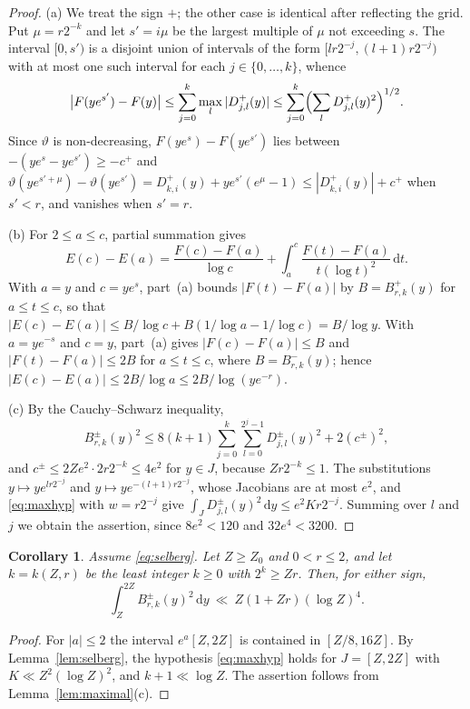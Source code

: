 \documentclass[11pt,reqno]{amsart}
\newtheorem{corollary}[theorem]{Corollary}
\theoremstyle{definition}
\theoremstyle{remark}
\numberwithin{equation}{section}
\newcommand{\dd}{\mathrm{d}}
\begin{document}
\begin{proof}
(a) We treat the sign $+$; the other case is identical after reflecting the grid. Put $\mu=r2^{-k}$ and let $s'=i\mu$ be the largest multiple of $\mu$ not exceeding $s$. The interval $[0,s')$ is a disjoint union of intervals of the form $[lr2^{-j},(l+1)r2^{-j})$ with at most one such interval for each $j\in\{0,\dots,k\}$, whence
\[
 \bigl|F(ye^{s'})-F(y)\bigr|\le\sum_{j=0}^k\max_{l}|D^+_{j,l}(y)|\le\sum_{j=0}^k\Bigl(\sum_{l}D^+_{j,l}(y)^2\Bigr)^{1/2} .
\]
Since $\vartheta$ is non-decreasing, $F(ye^s)-F(ye^{s'})$ lies between $-(ye^s-ye^{s'})\ge-c^+$ and $\vartheta(ye^{s'+\mu})-\vartheta(ye^{s'})=D^+_{k,i}(y)+ye^{s'}(e^{\mu}-1)\le|D^+_{k,i}(y)|+c^+$ when $s'<r$, and vanishes when $s'=r$.

(b) For $2\le a\le c$, partial summation gives
\[
 E(c)-E(a)=\frac{F(c)-F(a)}{\log c}+\int_a^c\frac{F(t)-F(a)}{t(\log t)^2}\,\dd t .
\]
With $a=y$ and $c=ye^s$, part~(a) bounds $|F(t)-F(a)|$ by $B=B^+_{r,k}(y)$ for $a\le t\le c$, so that $|E(c)-E(a)|\le B/\log c+B(1/\log a-1/\log c)=B/\log y$. With $a=ye^{-s}$ and $c=y$, part~(a) gives $|F(c)-F(a)|\le B$ and $|F(t)-F(a)|\le2B$ for $a\le t\le c$, where $B=B^-_{r,k}(y)$; hence $|E(c)-E(a)|\le2B/\log a\le2B/\log(ye^{-r})$.

(c) By the Cauchy--Schwarz inequality,
\[
 B^\pm_{r,k}(y)^2\le8(k+1)\sum_{j=0}^k\sum_{l=0}^{2^j-1}D^\pm_{j,l}(y)^2+2(c^\pm)^2 ,
\]
and $c^\pm\le2Ze^2\cdot2r2^{-k}\le4e^2$ for $y\in J$, because $Zr2^{-k}\le1$. The substitutions $y\mapsto ye^{lr2^{-j}}$ and $y\mapsto ye^{-(l+1)r2^{-j}}$, whose Jacobians are at most $e^2$, and \eqref{eq:maxhyp} with $w=r2^{-j}$ give $\int_JD^\pm_{j,l}(y)^2\,\dd y\le e^2Kr2^{-j}$. Summing over $l$ and $j$ we obtain the assertion, since $8e^2<120$ and $32e^4<3200$.
\end{proof}

\begin{corollary}\label{cor:maximal}
Assume \eqref{eq:selberg}. Let $Z\ge Z_0$ and $0<r\le2$, and let $k=k(Z,r)$ be the least integer $k\ge0$ with $2^k\ge Zr$. Then, for either sign,
\[
 \int_Z^{2Z}B^\pm_{r,k}(y)^2\,\dd y\ \ll\ Z(1+Zr)(\log Z)^4 .
\]
\end{corollary}

\begin{proof}
For $|a|\le2$ the interval $e^a[Z,2Z]$ is contained in $[Z/8,16Z]$. By Lemma~\ref{lem:selberg}, the hypothesis \eqref{eq:maxhyp} holds for $J=[Z,2Z]$ with $K\ll Z^2(\log Z)^2$, and $k+1\ll\log Z$. The assertion follows from Lemma~\ref{lem:maximal}(c).
\end{proof}
\end{document}
